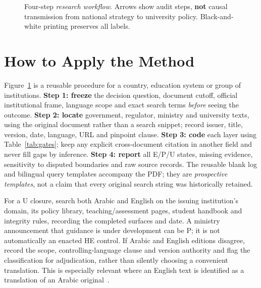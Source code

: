 \documentclass[conference,letterpaper]{IEEEtran}
\begin{document}
\begin{figure}[t]
\centering
{}
\caption{Four-step \emph{research workflow}. Arrows show audit steps, \textbf{not} causal transmission from national strategy to university policy. Black-and-white printing preserves all labels.}\label{fig:workflow}
\end{figure}

\section{How to Apply the Method}
Figure~\ref{fig:workflow} is a reusable procedure for a country, education system or group of institutions. \textbf{Step 1: freeze} the decision question, document cutoff, official institutional frame, language scope and exact search terms \emph{before} seeing the outcome. \textbf{Step 2: locate} government, regulator, ministry and university texts, using the original document rather than a search snippet; record issuer, title, version, date, language, URL and pinpoint clause. \textbf{Step 3: code} each layer using Table~\ref{tab:gates}; keep any explicit cross-document citation in another field and never fill gaps by inference. \textbf{Step 4: report} all E/P/U states, missing evidence, sensitivity to disputed boundaries and raw source records. The reusable blank log and bilingual query templates accompany the PDF; they are \emph{prospective templates}, not a claim that every original search string was historically retained.

For a U closure, search both Arabic and English on the issuing institution's domain, its policy library, teaching/assessment pages, student handbook and integrity rules, recording the completed surfaces and date. A ministry announcement that guidance is under development can be P; it is not automatically an enacted HE control. If Arabic and English editions disagree, record the scope, controlling-language clause and version authority and flag the classification for adjudication, rather than silently choosing a convenient translation. This is especially relevant where an English text is identified as a translation of an Arabic original~\cite{qataru}.
\end{document}

